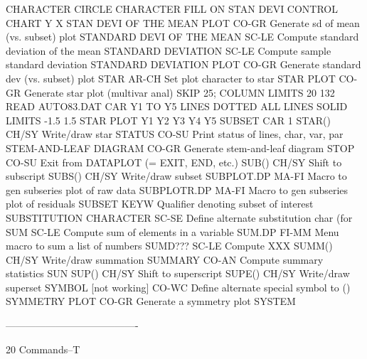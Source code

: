                                   CHARACTER CIRCLE
                                  CHARACTER FILL ON
                                  STAN DEVI CONTROL CHART Y X
STAN DEVI OF THE MEAN PLOT  CO-GR Generate sd of mean (vs. subset) plot
STANDARD DEVI OF THE MEAN   SC-LE Compute standard deviation of the mean
STANDARD DEVIATION          SC-LE Compute sample standard deviation
STANDARD DEVIATION PLOT     CO-GR Generate standard dev (vs. subset) plot
STAR                        AR-CH Set plot character to star
STAR PLOT                   CO-GR Generate star plot (multivar anal)
                                  SKIP 25; COLUMN LIMITS 20 132
                                  READ AUTO83.DAT CAR Y1 TO Y5
                                  LINES DOTTED ALL
                                  LINES SOLID
                                  LIMITS -1.5 1.5
                                  STAR PLOT Y1 Y2 Y3 Y4 Y5 SUBSET CAR 1
STAR()                      CH/SY Write/draw star
STATUS                      CO-SU Print status of lines, char, var, par
STEM-AND-LEAF DIAGRAM       CO-GR Generate stem-and-leaf diagram
STOP                        CO-SU Exit from DATAPLOT (= EXIT, END, etc.)
SUB()                       CH/SY Shift to subscript
SUBS()                      CH/SY Write/draw subset
SUBPLOT.DP                  MA-FI Macro to gen subseries plot of raw data
SUBPLOTR.DP                 MA-FI Macro to gen subseries plot of residuals
SUBSET                      KEYW  Qualifier denoting subset of interest
SUBSTITUTION CHARACTER      SC-SE Define alternate substitution char (for \)
SUM                         SC-LE Compute sum of elements in a variable
SUM.DP                      FI-MM Menu macro to sum a list of numbers
SUMD???                     SC-LE Compute XXX
SUMM()                      CH/SY Write/draw summation
SUMMARY                     CO-AN Compute summary statistics
SUN
SUP()                       CH/SY Shift to superscript
SUPE()                      CH/SY Write/draw superset
SYMBOL [not working]        CO-WC Define alternate special symbol to ()
SYMMETRY PLOT               CO-GR Generate a symmetry plot
SYSTEM
 
----------------------------------------
 
20
Commands--T
 
